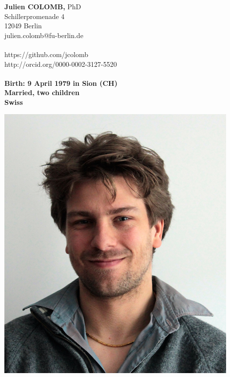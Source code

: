 \begin{minipage}[t]{\textwidth}
    \begin{minipage}[b]{0.5\textwidth}
        \textbf{\Large Julien COLOMB}{\large \textbf, PhD}\\
        Schillerpromenade 4\\
        12049 Berlin\\
        julien.colomb@fu-berlin.de\\
         \\
        https://github.com/jcolomb\\
         http://orcid.org/0000-0002-3127-5520\\
         \\
   
        \textbf{Birth: 9 April 1979 in Sion (CH)}\\
        \textbf{Married, two children}\\
        \textbf{Swiss}
         
    \end{minipage}\hfill
    \begin{minipage}[b]{0.5\textwidth}
        \begin{flushright}
            \includegraphics[scale=0.3] {figures/photo_CV.jpg}
        \end{flushright}
    \end{minipage}
\end{minipage}\\

